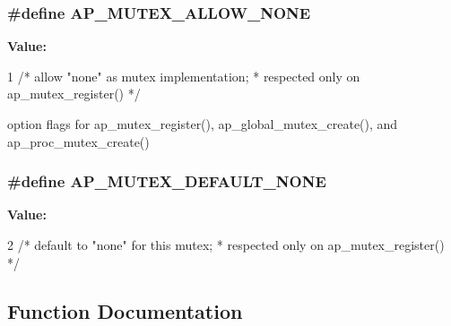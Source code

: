 \subsubsection[{\texorpdfstring{A\+P\+\_\+\+M\+U\+T\+E\+X\+\_\+\+A\+L\+L\+O\+W\+\_\+\+N\+O\+NE}{AP_MUTEX_ALLOW_NONE}}]{\setlength{\rightskip}{0pt plus 5cm}\#define A\+P\+\_\+\+M\+U\+T\+E\+X\+\_\+\+A\+L\+L\+O\+W\+\_\+\+N\+O\+NE}\hypertarget{group__APACHE__CORE__MUTEX_ga8d0b1fe7b3697aec18c41ec8cf9f6d98}{}\label{group__APACHE__CORE__MUTEX_ga8d0b1fe7b3697aec18c41ec8cf9f6d98}
{\bfseries Value\+:}
\begin{DoxyCode}
1 \textcolor{comment}{/* allow "none" as mutex implementation;}
\textcolor{comment}{                                  * respected only on ap\_mutex\_register()}
\textcolor{comment}{                                  */}
\end{DoxyCode}
option flags for ap\+\_\+mutex\+\_\+register(), ap\+\_\+global\+\_\+mutex\+\_\+create(), and ap\+\_\+proc\+\_\+mutex\+\_\+create() 
\subsubsection[{\texorpdfstring{A\+P\+\_\+\+M\+U\+T\+E\+X\+\_\+\+D\+E\+F\+A\+U\+L\+T\+\_\+\+N\+O\+NE}{AP_MUTEX_DEFAULT_NONE}}]{\setlength{\rightskip}{0pt plus 5cm}\#define A\+P\+\_\+\+M\+U\+T\+E\+X\+\_\+\+D\+E\+F\+A\+U\+L\+T\+\_\+\+N\+O\+NE}\hypertarget{group__APACHE__CORE__MUTEX_ga3a071a6861aac7a88042b3130017e0c0}{}\label{group__APACHE__CORE__MUTEX_ga3a071a6861aac7a88042b3130017e0c0}
{\bfseries Value\+:}
\begin{DoxyCode}
2 \textcolor{comment}{/* default to "none" for this mutex;}
\textcolor{comment}{                                  * respected only on ap\_mutex\_register()}
\textcolor{comment}{                                  */}
\end{DoxyCode}


\subsection{Function Documentation}
